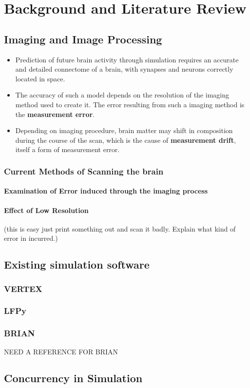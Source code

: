 \chapter{Background and Literature Review}

\section{Imaging and Image Processing}

\begin{itemize}
    \item Prediction of future brain activity through simulation requires an accurate and detailed connectome of a brain, with synapses and neurons correctly located in space.\autocite{bostrom_whole_2008}
    \item The accuracy of such a model depends on the resolution of the imaging method used to create it. The error resulting from such a imaging method is the \textbf{measurement error}. 
    \item Depending on imaging procedure, brain matter may shift in composition during the course of the scan, which is the cause of \textbf{measurement drift}, itself a form of measurement error.
\end{itemize}

\subsection{Current Methods of Scanning the brain}

\subsubsection[Error induced through the imaging process]{Examination of Error induced through the imaging process}



\subsubsection[Error induced through low resolution]{Effect of Low Resolution} 
(this is easy just print something out
and scan it badly. Explain what kind of error in incurred.)

\section{Existing simulation software}

\subsection{VERTEX}
\autocite{tomsett_virtual_2015} \autocite{thornton_virtual_2019}
\subsection{LFPy}
\autocite{hagen_lfpy_2019} \autocite{hagen_hybrid_2016}
\subsection{BRIAN}
NEED A REFERENCE FOR BRIAN

\section{Concurrency in Simulation}

